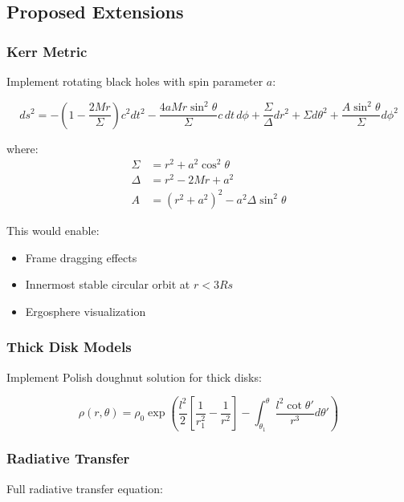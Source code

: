 \documentclass[12pt,a4paper]{article}
\theoremstyle{definition}
\theoremstyle{remark}
\begin{document}
\subsection{Proposed Extensions}

\subsubsection{Kerr Metric}

Implement rotating black holes with spin parameter $a$:

\begin{equation}
    ds^2 = -\left(1 - \frac{2Mr}{\Sigma}\right)c^2dt^2 - \frac{4aMr\sin^2\theta}{\Sigma}c \, dt \, d\phi + \frac{\Sigma}{\Delta}dr^2 + \Sigma d\theta^2 + \frac{A\sin^2\theta}{\Sigma}d\phi^2
\end{equation}

where:
\begin{align}
    \Sigma &= r^2 + a^2\cos^2\theta \\
    \Delta &= r^2 - 2Mr + a^2 \\
    A &= (r^2 + a^2)^2 - a^2\Delta\sin^2\theta
\end{align}

This would enable:
\begin{itemize}
    \item Frame dragging effects
    \item Innermost stable circular orbit at $r < 3Rs$
    \item Ergosphere visualization
\end{itemize}

\subsubsection{Thick Disk Models}

Implement Polish doughnut solution for thick disks:

\begin{equation}
    \rho(r, \theta) = \rho_0 \exp\left(\frac{l^2}{2}\left[\frac{1}{r_1^2} - \frac{1}{r^2}\right] - \int_{\theta_1}^{\theta}\frac{l^2\cot\theta'}{r^3}d\theta'\right)
\end{equation}

\subsubsection{Radiative Transfer}

Full radiative transfer equation:
\end{document}
